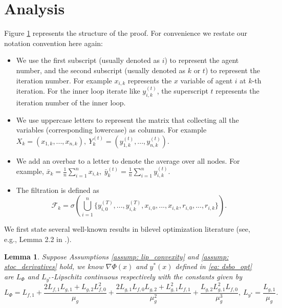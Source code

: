 \documentclass{article}
\theoremstyle{plain}
\newtheorem{lemma}[theorem]{Lemma}
\theoremstyle{definition}
\theoremstyle{remark}
\newcommand{\F}{\mathcal{F}}
\begin{document}
\section{Analysis}\label{sec: analysis}
Figure \ref{fig: proof} represents the structure of the proof. For convenience we restate our notation convention here again:
\begin{itemize}
    \item We use the first subscript (usually denoted as $i$) to represent the agent number, and the second subscript (usually denoted as $k$ or $t$) to represent the iteration number. For example $x_{i,k}$ represents the $x$ variable of agent $i$ at $k$-th iteration. For the inner loop iterate like $y_{i,k}^{(t)}$, the superscript $t$ represents the iteration number of the inner loop.
    
    \item We use uppercase letters to represent the matrix that collecting all the variables (corresponding lowercase) as columns. For example $X_k = \left(x_{1,k}, ..., x_{n,k}\right),\ Y_k^{(t)} = \left(y_{1,k}^{(t)},...,y_{n,k}^{(t)}\right)$.
    
    \item We add an overbar to a letter to denote the average over all nodes. For example, $\bar{x}_k = \frac{1}{n}\sum_{i=1}^{n}x_{i,k},\ \bar{y}_{k}^{(t)} = \frac{1}{n}\sum_{i=1}^{n}y_{i,k}^{(t)}$.
    
    \item The filtration is defined as
    \[
        \F_k = \sigma\left(\bigcup_{i=1}^{n}\{y_{i,0}^{(T)}, ..., y_{i,k}^{(T)}, x_{i,0},...,x_{i,k}, r_{i,0},...,r_{i,k}\} \right).
    \]
\end{itemize}
\begin{figure}[omitted: a diagram of this paper's results, not reproduced here]\label{fig: proof}\end{figure}


We first state several well-known results in bilevel optimization literature (see, e.g., Lemma 2.2 in \citet{ghadimi2018approximation}.).
\begin{lemma}\label{lem: smoothness}
    Suppose Assumptions \ref{assump: lip_convexity} and \ref{assump: stoc_derivatives} hold, we know $\nabla\Phi(x)$ and $y^*(x)$ defined in \eqref{eq: dsbo_opt} are $L_{\Phi}$ and $L_{y^*}$-Lipschitz continuous respectively with the constants given by
    \begin{equation}\label{eq: smoothness_const}
        L_{\Phi} = L_{f,1} + \frac{2L_{f,1}L_{g,1} + L_{g,2}L_{f,0}^2 }{\mu_g} + \frac{2L_{g,1}L_{f,0}L_{g,2}+L_{g,1}^2L_{f,1}}{\mu_g^2} + \frac{L_{g,2}L_{g,1}^2L_{f,0}}{\mu_g^3},\ L_{y^*} = \frac{L_{g,1}}{\mu_g}.
    \end{equation}
\end{lemma}
\end{document}
